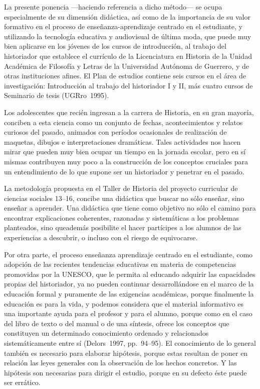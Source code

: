  
La presente ponencia ---haciendo referencia a dicho método--- se ocupa 
especialmente de su dimensión didáctica, así como de la importancia de 
su valor formativo en el proceso de enseñanza-aprendizaje centrado en 
el estudiante, y utilizando la tecnología educativa y audiovisual de 
última moda, que puede muy bien aplicarse en los jóvenes de los cursos 
de introducción, al trabajo del historiador que establece el currículo 
de la Licenciatura en Historia de la Unidad Académica de Filosofía y 
Letras de la Universidad Autónoma de Guerrero, y de otras instituciones 
afines. El Plan de estudios contiene seis cursos en el área de 
investigación: Introducción al trabajo del historiador I y II, más 
cuatro cursos de Seminario de tesis (UGRro~1995).

 
Los adolescentes que recién ingresan a la carrera de Historia, en su 
gran mayoría, conciben a esta ciencia como un conjunto de fechas, 
acontecimientos y relatos curiosos del pasado, animados con períodos 
ocasionales de realización de maquetas, dibujos e interpretaciones 
dramáticas. Tales actividades nos hacen mirar que pueden muy bien 
ocupar un tiempo en la jornada escolar, pero en sí mismas contribuyen 
muy poco a la construcción de los conceptos cruciales para un entendimiento 
de lo que supone ser un historiador y penetrar en el pasado.

\enlargethispage{1\baselineskip} 
La metodología propuesta en el Taller de Historia del proyecto 
curricular de ciencias sociales 13--16, concibe una didáctica que buscar 
no sólo enseñar, sino enseñar a aprender. Una didáctica que 
tiene como objetivo no sólo el camino para encontrar explicaciones 
coherentes, razonadas y sistemáticas a los problemas planteados, sino 
que\linebreak además posibilite el hacer partícipes a los alumnos de las 
experiencias a descubrir, o incluso con el riesgo de equivocarse.

 
Por otra parte, el proceso enseñanza aprendizaje centrado en el 
estudiante, como adopción de las recientes tendencias educativas en 
materia de competencias promovidas por la UNESCO, que le permita al 
educando adquirir las capacidades propias del historiador, ya no pueden 
continuar desarrollándose en el marco de la educación formal y 
puramente de las exigencias académicas, porque finalmente la educación 
es para la vida, y podemos considera que el material informativo es una 
importante ayuda para el profesor y para el alumno, porque como en el 
caso del libro de texto o del manual o de una síntesis, ofrece los 
conceptos que constituyen un determinado conocimiento ordenado y 
relacionados sistemáticamente entre sí (Delors~1997, pp.~94--95). 
El conocimiento de lo general también es necesario para elaborar 
hipótesis, porque estas resultan de poner en relación las leyes 
generales con la observación de los hechos concretos. Y las hipótesis 
son necesarias para dirigir el estudio, porque en su defecto éste puede 
ser errático.


